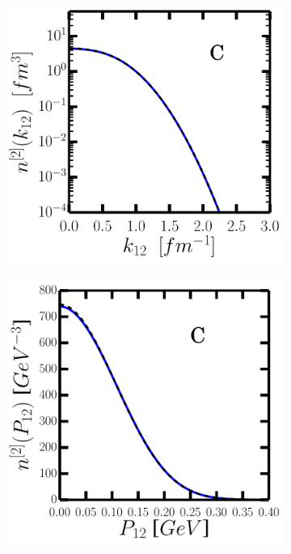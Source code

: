 \documentclass[11pt,twoside]{book}
\begin{document}
\begin{figure}
\centering
\begin{subfigure}{0.46\textwidth}
\includegraphics[width=\textwidth]{./figuren/C_tb_rel.pdf}
\end{subfigure}
\begin{subfigure}{0.46\textwidth}
\includegraphics[width=\textwidth]{./figuren/C_tb_cm.pdf}

\end{subfigure}
\end{figure}
\end{document}
